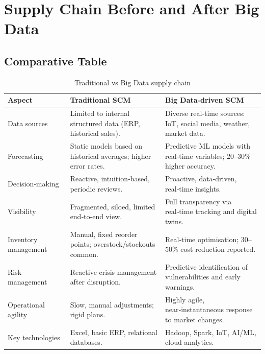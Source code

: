 \documentclass[12pt, a4paper]{report}
\newcommand{\altrows}{\rowcolors{2}{lightbg}{white}}
\begin{document}
\chapter{Supply Chain Before and After Big Data}
\section{Comparative Table}
\begin{table}[H]
   \centering
   \renewcommand{\arraystretch}{1.3}
   \altrows
   \small
   \caption{Traditional vs Big Data supply chain}
   \label{tab:comparison}
   \begin{tabular}{@{}p{3.2cm}p{4.5cm}p{4.5cm}@{}}
      \toprule
      \textbf{Aspect} & \textbf{Traditional SCM} & \textbf{Big Data‑driven SCM} \\
      \midrule
      Data sources & Limited to internal structured data (ERP, historical sales). & Diverse real‑time sources: IoT, social media, weather, market data. \\
      Forecasting & Static models based on historical averages; higher error rates. & Predictive ML models with real‑time variables; 20–30\% higher accuracy. \\
      Decision‑making & Reactive, intuition‑based, periodic reviews. & Proactive, data‑driven, real‑time insights. \\
      Visibility & Fragmented, siloed, limited end‑to‑end view. & Full transparency via real‑time tracking and digital twins. \\
      Inventory management & Manual, fixed reorder points; overstock/stockouts common. & Real‑time optimisation; 30–50\% cost reduction reported. \\
      Risk management & Reactive crisis management after disruption. & Predictive identification of vulnerabilities and early warnings. \\
      Operational agility & Slow, manual adjustments; rigid plans. & Highly agile, near‑instantaneous response to market changes. \\
      Key technologies & Excel, basic ERP, relational databases. & Hadoop, Spark, IoT, AI/ML, cloud analytics. \\
      \bottomrule
   \end{tabular}
\end{table}
\end{document}
